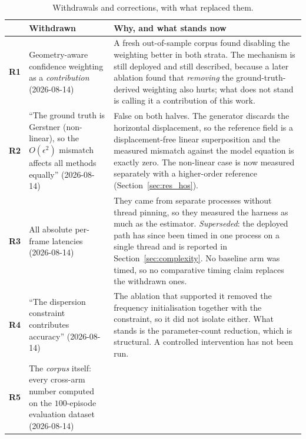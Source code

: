 \begin{table}[!htbp]
\centering
\footnotesize
\caption{Withdrawals and corrections, with what replaced them.}
\label{tab:changes}
\begin{tabular}{lp{}p{}}
\toprule
& Withdrawn & Why, and what stands now \\
\midrule
\textbf{R1} & Geometry-aware confidence weighting as a \emph{contribution}
(2026-08-14) &
A fresh out-of-sample corpus found disabling the weighting better in both strata.
The mechanism is still deployed and still described, because a later ablation
found that \emph{removing} the ground-truth-derived weighting also hurts; what
does not stand is calling it a contribution of this work. \\
\addlinespace
\textbf{R2} & ``The ground truth is Gerstner (non-linear), so the
$O(\epsilon^2)$ mismatch affects all methods equally'' (2026-08-14) &
False on both halves. The generator discards the horizontal displacement, so the
reference field is a displacement-free linear superposition and the measured
mismatch against the model equation is exactly zero. The non-linear case is now
measured separately with a higher-order reference
(Section~\ref{sec:res_hos}). \\
\addlinespace
\textbf{R3} & All absolute per-frame latencies (2026-08-14) &
They came from separate processes without thread pinning, so they measured the
harness as much as the estimator. \emph{Superseded}: the deployed path has since
been timed in one process on a single thread and is reported in
Section~\ref{sec:complexity}. No baseline arm was timed, so no comparative timing
claim replaces the withdrawn ones. \\
\addlinespace
\textbf{R4} & ``The dispersion constraint contributes accuracy''
(2026-08-14) &
The ablation that supported it removed the frequency initialisation together with
the constraint, so it did not isolate either. What stands is the parameter-count
reduction, which is structural. A controlled intervention has not been run. \\
\addlinespace
\textbf{R5} & The \emph{corpus} itself: every cross-arm number computed on the
$100$-episode evaluation dataset (2026-08-14) &

\end{tabular}
\end{table}
